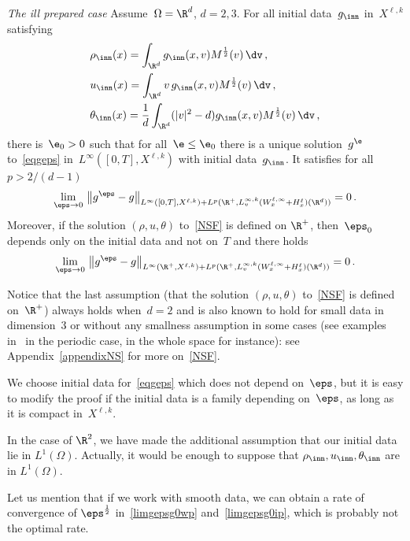 \begin{theo}
\smallskip
\emph{The ill prepared case}\pointir
Assume~$\Omega = \R^d$, $d= 2,3$. For all initial data~$g_{\inn}$ in~$X^{\ell,k}$ satisfying
\begin{align*}
&\rho_{\inn}(x)= \int_{\R^d} g_{\inn} (x,v)M^\frac12 (v) \, \dv \,,\\
&u_{\inn} (x)= \int_{\R^d} v\, g_{\inn} (x,v)M^\frac12 (v) \, \dv\,, \\
&\theta_{\inn} (x)= \frac{1}{d} \int_{\R^d} (|v|^2-d) g_{\inn} (x,v)M^\frac12 (v) \, \dv \,,
\end{align*}
there is~$\e_0>0$ such that for all~$\e\leq \e_0$ there is a unique solution~$g^\e$ to~\eqref{eqgeps} in~{$L^\infty([0,T],X^{\ell,k})$} with initial data~$g_{\inn}$. It satisfies for all~$p>2/(d-1)$
\begin{equation}\label{limgepsg0ip}
\lim_{\eps\to 0} \, \big\| g^\eps-g
\big\|_{L^\infty([0,T],X^{\ell,k}) + {L^p(\R^+,L^{\infty,k}_v(W^{\ell,\infty}_x{+ H^\ell_x})(\R^d))}} = 0 \,.
\end{equation}
Moreover, if the solution $(\rho,u,\theta)$ to~\eqref{NSF} is defined on $\R^+$, then~$\eps_0$ depends only on the initial data and not on~$T$ and there holds
\[
\lim_{\eps\to 0} \, \big\| g^\eps-g
\big\|_{L^\infty(\R^+,X^{\ell,k}) +L^p(\R^+,L^{\infty,k}_v(W^{\ell,\infty}_x{+ H^\ell_x})(\R^d)) }= 0 \,.
\]
\end{theo}
Notice that the last assumption (that the solution $(\rho,u,\theta)$ to~\eqref{NSF} is defined on~$\R^+$) always holds when~$d=2$ and is also known to hold for small data in dimension~3 or without any smallness assumption in some cases (see examples in~\cite{cg1} in the periodic case, \cite{cg} in the whole space for instance): see Appendix~\ref{appendixNS} for more on~\eqref{NSF}.
\begin{rema}
We choose initial data for~\eqref{eqgeps} which does not depend on~$\eps$, but it is easy to modify the proof if the initial data is a family depending on~$\eps$, as long as it is compact in~$X^{\ell,k}$.
\end{rema}
\begin{rema}
In the case of $\R^2$, we have made the additional assumption that our initial data lie in $L^1(\Omega)$. Actually, it would be enough to suppose that $\rho_{\inn}, u_{\inn}, \theta_{\inn} $ are in $L^1(\Omega)$.
\end{rema}
\begin{rema}
Let us mention that if we work with smooth data, we can obtain a rate of convergence of $\eps^\frac12$ in~\eqref{limgepsg0wp} and~\eqref{limgepsg0ip}, which is probably not the optimal rate.
\end{rema}

